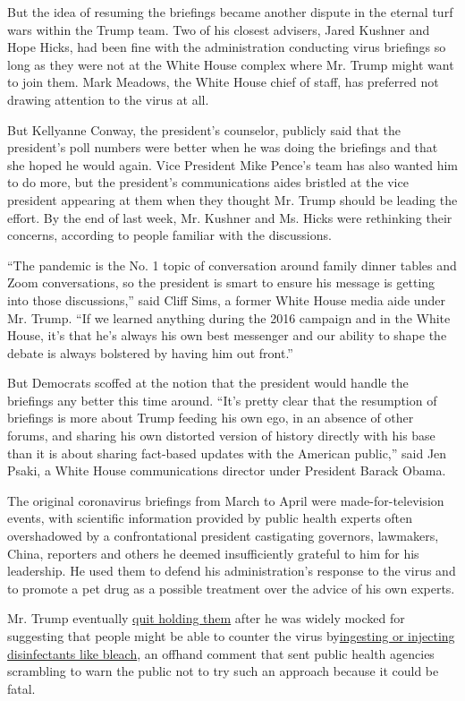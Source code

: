 But the idea of resuming the briefings became another dispute in the
eternal turf wars within the Trump team. Two of his closest advisers,
Jared Kushner and Hope Hicks, had been fine with the administration
conducting virus briefings so long as they were not at the White House
complex where Mr. Trump might want to join them. Mark Meadows, the White
House chief of staff, has preferred not drawing attention to the virus
at all.

But Kellyanne Conway, the president's counselor, publicly said that the
president's poll numbers were better when he was doing the briefings and
that she hoped he would again. Vice President Mike Pence's team has also
wanted him to do more, but the president's communications aides bristled
at the vice president appearing at them when they thought Mr. Trump
should be leading the effort. By the end of last week, Mr. Kushner and
Ms. Hicks were rethinking their concerns, according to people familiar
with the discussions.

``The pandemic is the No. 1 topic of conversation around family dinner
tables and Zoom conversations, so the president is smart to ensure his
message is getting into those discussions,'' said Cliff Sims, a former
White House media aide under Mr. Trump. ``If we learned anything during
the 2016 campaign and in the White House, it's that he's always his own
best messenger and our ability to shape the debate is always bolstered
by having him out front.''

But Democrats scoffed at the notion that the president would handle the
briefings any better this time around. ``It's pretty clear that the
resumption of briefings is more about Trump feeding his own ego, in an
absence of other forums, and sharing his own distorted version of
history directly with his base than it is about sharing fact-based
updates with the American public,'' said Jen Psaki, a White House
communications director under President Barack Obama.

The original coronavirus briefings from March to April were
made-for-television events, with scientific information provided by
public health experts often overshadowed by a confrontational president
castigating governors, lawmakers, China, reporters and others he deemed
insufficiently grateful to him for his leadership. He used them to
defend his administration's response to the virus and to promote a pet
drug as a possible treatment over the advice of his own experts.

Mr. Trump eventually
\href{https://www.nytimes.com/2020/04/27/us/politics/trump-coronavirus-briefings.html}{quit
holding them} after he was widely mocked for suggesting that people
might be able to counter the virus
by\href{https://www.nytimes.com/2020/04/24/us/politics/trump-inject-disinfectant-bleach-coronavirus.html}{ingesting
or injecting disinfectants like bleach}, an offhand comment that sent
public health agencies scrambling to warn the public not to try such an
approach because it could be fatal.

